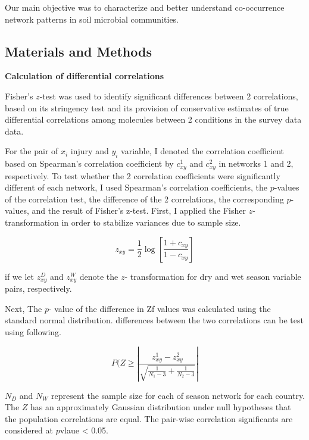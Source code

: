 Our main objective was to characterize and better understand co-occurrence network patterns in soil microbial communities.

\subsection{Materials and Methods}


\textbf{Calculation of differential correlations}

Fisher's $z$-test was used to identify significant differences between 2 correlations, based on its stringency test and its provision of conservative estimates of true differential correlations among molecules between 2 conditions in the survey data data. 


For the pair of $x_{i}$ injury and $y_{i}$ variable, I denoted the correlation coefficient based on Spearman's correlation coefficient by $c_{xy}^1$ and $c_{xy}^2$ in networks 1 and 2, respectively. To test whether the 2 correlation coefficients were significantly different of each network, I used Spearman's correlation coefficients, the $p$-values of the correlation test, the difference of the 2 correlations, the corresponding $p$-values, and the result of Fisher's z-test. First, I applied the Fisher $z$-transformation in order to stabilize variances due to sample size.

\begin{equation}
\label{eq:zvalue}
z_{xy} = \frac{1}{2} \log\left[{\frac{1 + c_{xy}}{1 - c_{xy}}}\right]
\end{equation}

if we let $z_{xy}^D $ and $z_{xy}^W$ denote the $z$- transformation for dry and wet season variable pairs, respectively.

Next, The $p$- value of the difference in Zf values was calculated
using the standard normal distribution. differences between the two correlations can be test using following. 

\begin{equation}
\label{eq:pofz}
P(Z\geq \left | \frac{z_{xy}^1 - z_{xy}^2}{\sqrt{\frac{1}{N_{1}-3}+ \frac{1}{N_{2}-3}}} \right |
\end{equation}

$N_{D}$ and $N_{W}$ represent the sample size for each of season network for each country. The $Z$ has an approximately Gaussian distribution under null hypotheses that the population correlations are equal. The pair-wise correlation significants are considered at $p$vlaue < 0.05.

